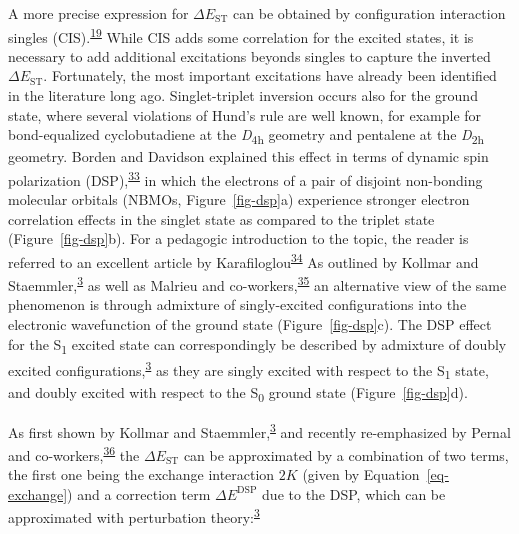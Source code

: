\documentclass[
  number,
  3p]{elsarticle}
\newcommand{\DeltaE}[2][]{\Delta E^{\mathrm{#1}}_{\mathrm{#2}}}
\begin{document}
A more precise expression for \(\DeltaE{ST}\) can be obtained by
configuration interaction singles
(CIS).\textsuperscript{\protect\hyperlink{ref-beveridgeParametrizationSemiempiricalPi1971}{19}}
While CIS adds some correlation for the excited states, it is necessary
to add additional excitations beyonds singles to capture the inverted
\(\DeltaE{ST}\). Fortunately, the most important excitations have
already been identified in the literature long ago. Singlet-triplet
inversion occurs also for the ground state, where several violations of
Hund's rule are well known, for example for bond-equalized
cyclobutadiene at the \emph{D}\textsubscript{4h} geometry and pentalene
at the \emph{D}\textsubscript{2h} geometry. Borden and Davidson
explained this effect in terms of dynamic spin polarization
(DSP),\textsuperscript{\protect\hyperlink{ref-bordenTheoreticalStudiesDiradicals1981}{33}}
in which the electrons of a pair of disjoint non-bonding molecular
orbitals (NBMOs, Figure~\ref{fig-dsp}a) experience stronger electron
correlation effects in the singlet state as compared to the triplet
state (Figure~\ref{fig-dsp}b). For a pedagogic introduction to the
topic, the reader is referred to an excellent article by
Karafiloglou\textsuperscript{\protect\hyperlink{ref-karafiloglouDoubleDynamicSpin1989}{34}}
As outlined by Kollmar and
Staemmler,\textsuperscript{\protect\hyperlink{ref-kollmarViolationHundRule1978}{3}}
as well as Malrieu and
co-workers,\textsuperscript{\protect\hyperlink{ref-benamorSpinPolarizationElectronic2020}{35}}
an alternative view of the same phenomenon is through admixture of
singly-excited configurations into the electronic wavefunction of the
ground state (Figure~\ref{fig-dsp}c). The DSP effect for the
S\textsubscript{1} excited state can correspondingly be described by
admixture of doubly excited
configurations,\textsuperscript{\protect\hyperlink{ref-kollmarViolationHundRule1978}{3}}
as they are singly excited with respect to the S\textsubscript{1} state,
and doubly excited with respect to the S\textsubscript{0} ground state
(Figure~\ref{fig-dsp}d).

As first shown by Kollmar and
Staemmler,\textsuperscript{\protect\hyperlink{ref-kollmarViolationHundRule1978}{3}}
and recently re-emphasized by Pernal and
co-workers,\textsuperscript{\protect\hyperlink{ref-drwalRoleSpinPolarization2023}{36}}
the \(\DeltaE{ST}\) can be approximated by a combination of two terms,
the first one being the exchange interaction \(2K\) (given by
Equation~\ref{eq-exchange}) and a correction term \(\DeltaE[DSP]{}\) due
to the DSP, which can be approximated with perturbation
theory:\textsuperscript{\protect\hyperlink{ref-kollmarViolationHundRule1978}{3}}
\end{document}
